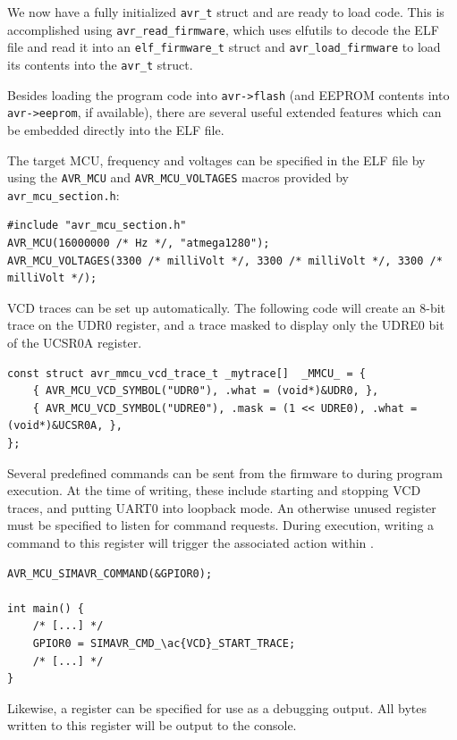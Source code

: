 We now have a fully initialized \lstinline|avr_t| struct and are ready to load
code. This is accomplished using \lstinline|avr_read_firmware|, which uses
elfutils to decode the \ac{ELF} file and read it into an \lstinline|elf_firmware_t|
struct and \lstinline|avr_load_firmware| to load its contents into the
\lstinline|avr_t| struct.

Besides loading the program code into \lstinline|avr->flash| (and \ac{EEPROM} contents
into \lstinline|avr->eeprom|, if available), there are several useful extended
features which can be embedded directly into the \ac{ELF} file.

The target \ac{MCU}, frequency and voltages can be specified in the \ac{ELF} file by using the
\lstinline|AVR_MCU| and \lstinline|AVR_MCU_VOLTAGES| macros provided by
\verb|avr_mcu_section.h|:

\begin{lstlisting}
#include "avr_mcu_section.h"
AVR_MCU(16000000 /* Hz */, "atmega1280");
AVR_MCU_VOLTAGES(3300 /* milliVolt */, 3300 /* milliVolt */, 3300 /* milliVolt */);
\end{lstlisting}

\ac{VCD} traces can be set up automatically. The following code will create an 8-bit
trace on the UDR0 register, and a trace masked to display only the UDRE0 bit of
the UCSR0A register.

\begin{lstlisting}
const struct avr_mmcu_vcd_trace_t _mytrace[]  _MMCU_ = {
    { AVR_MCU_VCD_SYMBOL("UDR0"), .what = (void*)&UDR0, },
    { AVR_MCU_VCD_SYMBOL("UDRE0"), .mask = (1 << UDRE0), .what = (void*)&UCSR0A, },
};
\end{lstlisting}

Several predefined commands can be sent from the firmware to \simavr during program execution.
At the time of writing, these include starting and stopping \ac{VCD} traces, and putting
UART0 into loopback mode. An otherwise unused register must be specified
to listen for command requests. During execution, writing a command to this
register will trigger the associated action within \simavr.

\begin{lstlisting}
AVR_MCU_SIMAVR_COMMAND(&GPIOR0);

int main() {
    /* [...] */
    GPIOR0 = SIMAVR_CMD_\ac{VCD}_START_TRACE;
    /* [...] */
}
\end{lstlisting}

Likewise, a register can be specified for use as a debugging output. All bytes
written to this register will be output to the console.

